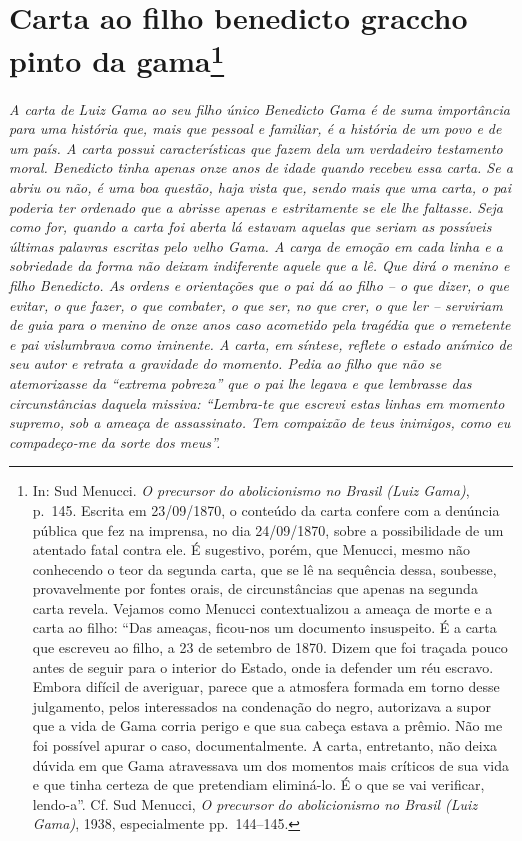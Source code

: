 {\chapter{Carta ao filho benedicto graccho pinto da gama\footnote{ In: Sud Menucci. \emph{O precursor do abolicionismo no
  Brasil (Luiz Gama)}, p.~145. Escrita em 23/09/1870, o conteúdo da
  carta confere com a denúncia pública que fez na imprensa, no dia
  24/09/1870, sobre a possibilidade de um atentado fatal contra ele. É
  sugestivo, porém, que Menucci, mesmo não conhecendo o teor da segunda
  carta, que se lê na sequência dessa, soubesse, provavelmente por
  fontes orais, de circunstâncias que apenas na segunda carta revela.
  Vejamos como Menucci contextualizou a ameaça de morte e a carta ao
  filho: ``Das ameaças, ficou-nos um documento insuspeito. É a carta que
  escreveu ao filho, a 23 de setembro de 1870. Dizem que foi traçada
  pouco antes de seguir para o interior do Estado, onde ia defender um
  réu escravo. Embora difícil de averiguar, parece que a atmosfera
  formada em torno desse julgamento, pelos interessados na condenação do
  negro, autorizava a supor que a vida de Gama corria perigo e que sua
  cabeça estava a prêmio. Não me foi possível apurar o caso,
  documentalmente. A carta, entretanto, não deixa dúvida em que Gama
  atravessava um dos momentos mais críticos de sua vida e que tinha
  certeza de que pretendiam eliminá-lo. É o que se vai verificar,
  lendo-a''. Cf. Sud Menucci, \emph{O precursor} \emph{do abolicionismo
  no Brasil (Luiz Gama)}, 1938, especialmente pp.~144--145.}} %

\begin{didascalia}
\emph{A carta de Luiz Gama ao seu filho único Benedicto Gama é de suma
importância para uma história que, mais que pessoal e familiar, é a
história de um povo e de um país. A carta possui características que
fazem dela um verdadeiro testamento moral. Benedicto tinha apenas onze
anos de idade quando recebeu essa carta. Se a abriu ou não, é uma boa
questão, haja vista que, sendo mais que uma carta, o pai poderia ter
ordenado que a abrisse apenas e estritamente se ele lhe faltasse. Seja
como for, quando a carta foi aberta lá estavam aquelas que seriam as
possíveis últimas palavras escritas pelo velho Gama. A carga de emoção
em cada linha e a sobriedade da forma não deixam indiferente aquele que
a lê. Que dirá o menino e filho Benedicto. As ordens e orientações que o
pai dá ao filho -- o que dizer, o que evitar, o que fazer, o que
combater, o que ser, no que crer, o que ler -- serviriam de guia para o
menino de onze anos caso acometido pela tragédia que o remetente e pai
vislumbrava como iminente. A carta, em síntese, reflete o estado anímico
de seu autor e retrata a gravidade do momento. Pedia ao filho que não se
atemorizasse da ``extrema pobreza'' que o pai lhe legava e que lembrasse
das circunstâncias daquela missiva: ``Lembra-te que escrevi estas linhas
em momento supremo, sob a ameaça de assassinato. Tem compaixão de teus
inimigos, como eu compadeço-me da sorte dos meus''.}
\end{didascalia}

}
